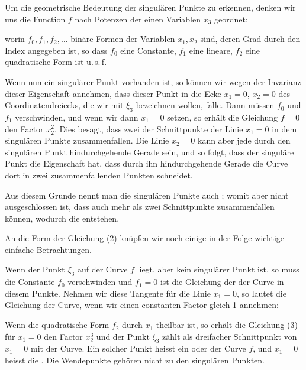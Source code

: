 Um die geometrische Bedeutung der singulären Punkte zu erkennen, denken wir uns die Function $f$ nach Potenzen der einen Variablen $x_3$ geordnet:

worin $f_0, f_1, f_2, \dots$ binäre Formen der Variablen $x_1, x_2$ sind, deren Grad durch den Index angegeben ist, so dass $f_0$ eine Constante, $f_1$ eine lineare, $f_2$ eine quadratische Form ist u.\,s.\,f.

Wenn nun ein singulärer Punkt vorhanden ist, so können wir wegen der Invarianz dieser Eigenschaft annehmen, dass dieser Punkt in die Ecke $x_1 = 0$, $x_2 = 0$ des Coordinatendreiecks, die wir mit $\xi_3$ bezeichnen wollen, falle. Dann müssen $f_0$ und $f_1$ verschwinden, und wenn wir dann $x_1 = 0$ setzen, so erhält die Gleichung $f = 0$ den Factor $x_2^2$. Dies besagt, dass zwei der Schnittpunkte der Linie $x_1 = 0$ in dem singulären Punkte zusammenfallen. Die Linie $x_2 = 0$ kann aber jede durch den singulären Punkt hindurchgehende Gerade sein, und so folgt, dass der singuläre Punkt die Eigenschaft hat, dass  durch ihn hindurchgehende Gerade die Curve dort in zwei zusammenfallenden Punkten schneidet. %

Aus diesem Grunde nennt man die singulären Punkte auch ; womit aber nicht ausgeschlossen ist, dass auch mehr als zwei Schnittpunkte zusammenfallen können, wodurch die  entstehen.

An die Form der Gleichung (2) knüpfen wir noch einige in der Folge wichtige einfache Betrachtungen.

Wenn der Punkt $\xi_3$ auf der Curve $f$ liegt, aber kein singulärer Punkt ist, so muss die Constante $f_0$ verschwinden und $f_1 = 0$ ist die Gleichung der  der Curve in diesem Punkte. Nehmen wir diese Tangente für die Linie $x_1 = 0$, so lautet die Gleichung der Curve, wenn wir einen constanten Factor gleich 1 annehmen:

Wenn die quadratische Form $f_2$ durch $x_1$ theilbar ist, so erhält die Gleichung (3) für $x_1 = 0$ den Factor $x_2^3$ und der Punkt $\xi_3$ zählt als dreifacher Schnittpunkt von $x_1 = 0$ mit der Curve. Ein solcher Punkt heisst ein  oder  der Curve $f$, und $x_1 = 0$ heisst die . Die Wendepunkte gehören nicht zu den singulären Punkten.
